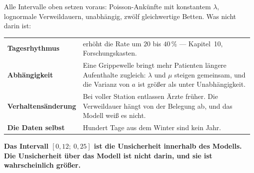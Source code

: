 \begin{warnung}
Alle Intervalle oben setzen voraus: Poisson-Ankünfte mit konstantem $\lambda$, lognormale Verweildauern, unabhängig, zwölf gleichwertige Betten. Was nicht darin ist:

\begin{center}
{\small
\renewcommand{\arraystretch}{1.5}
\begin{tabular}{@{}P{3.0cm}P{5.6cm}@{}}
\toprule
\textbf{Tagesrhythmus} & erhöht die Rate um $20$ bis $40\,\%$ --- Kapitel~10, Forschungskasten.\\
\textbf{Abhängigkeit} & Eine Grippewelle bringt mehr Patienten  längere Aufenthalte zugleich: $\lambda$ und $\mu$ steigen gemeinsam, und die Varianz von $a$ ist größer als unter Unabhängigkeit.\\
\textbf{Verhaltens\-änderung} & Bei voller Station entlassen Ärzte früher. Die Verweildauer hängt von der Belegung ab, und das Modell weiß es nicht.\\
\textbf{Die Daten selbst} & Hundert Tage aus dem Winter sind kein Jahr.\\
\bottomrule
\end{tabular}}
\end{center}

\begin{center}
\begin{minipage}{0.9\textwidth}
\textbf{Das Intervall $[0{,}12;\ 0{,}25]$ ist die Unsicherheit innerhalb des Modells. Die Unsicherheit über das Modell ist nicht darin, und sie ist wahrscheinlich größer.}
\end{minipage}
\end{center}

\begin{center}
\begin{minipage}{0.88\textwidth}
\end{minipage}
\end{center}
\end{warnung}


